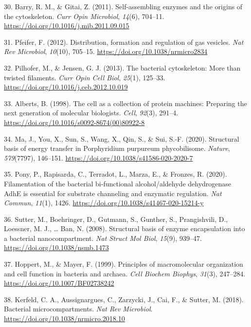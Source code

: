 \documentclass[]{tufte-book}
\begin{document}
\leavevmode\hypertarget{ref-barry2011}{}%
30. Barry, R. M., \& Gitai, Z. (2011). Self-assembling enzymes and the origins of the cytoskeleton. \emph{Curr Opin Microbiol}, \emph{14}(6), 704--11. \url{https://doi.org/10.1016/j.mib.2011.09.015}

\leavevmode\hypertarget{ref-pfeifer2012}{}%
31. Pfeifer, F. (2012). Distribution, formation and regulation of gas vesicles. \emph{Nat Rev Microbiol}, \emph{10}(10), 705--15. \url{https://doi.org/10.1038/nrmicro2834}

\leavevmode\hypertarget{ref-pilhofer2013}{}%
32. Pilhofer, M., \& Jensen, G. J. (2013). The bacterial cytoskeleton: More than twisted filaments. \emph{Curr Opin Cell Biol}, \emph{25}(1), 125--33. \url{https://doi.org/10.1016/j.ceb.2012.10.019}

\leavevmode\hypertarget{ref-alberts1998}{}%
33. Alberts, B. (1998). The cell as a collection of protein machines: Preparing the next generation of molecular biologists. \emph{Cell}, \emph{92}(3), 291--4. \url{https://doi.org/10.1016/s0092-8674(00)80922-8}

\leavevmode\hypertarget{ref-ma2020}{}%
34. Ma, J., You, X., Sun, S., Wang, X., Qin, S., \& Sui, S.-F. (2020). Structural basis of energy transfer in Porphyridium purpureum phycobilisome. \emph{Nature}, \emph{579}(7797), 146--151. \url{https://doi.org/10.1038/s41586-020-2020-7}

\leavevmode\hypertarget{ref-pony2020}{}%
35. Pony, P., Rapisarda, C., Terradot, L., Marza, E., \& Fronzes, R. (2020). Filamentation of the bacterial bi-functional alcohol/aldehyde dehydrogenase AdhE is essential for substrate channeling and enzymatic regulation. \emph{Nat Commun}, \emph{11}(1), 1426. \url{https://doi.org/10.1038/s41467-020-15214-y}

\leavevmode\hypertarget{ref-sutter2008}{}%
36. Sutter, M., Boehringer, D., Gutmann, S., Gunther, S., Prangishvili, D., Loessner, M. J., \ldots{} Ban, N. (2008). Structural basis of enzyme encapsulation into a bacterial nanocompartment. \emph{Nat Struct Mol Biol}, \emph{15}(9), 939--47. \url{https://doi.org/10.1038/nsmb.1473}

\leavevmode\hypertarget{ref-hoppert1999}{}%
37. Hoppert, M., \& Mayer, F. (1999). Principles of macromolecular organization and cell function in bacteria and archaea. \emph{Cell Biochem Biophys}, \emph{31}(3), 247--284. \url{https://doi.org/10.1007/BF02738242}

\leavevmode\hypertarget{ref-kerfeld2018}{}%
38. Kerfeld, C. A., Aussignargues, C., Zarzycki, J., Cai, F., \& Sutter, M. (2018). Bacterial microcompartments. \emph{Nat Rev Microbiol}. \url{https://doi.org/10.1038/nrmicro.2018.10}
\end{document}
